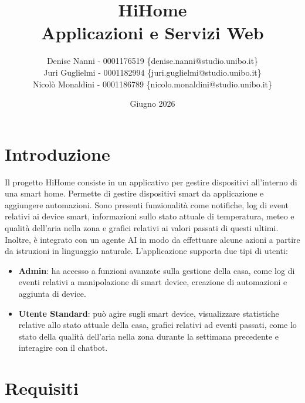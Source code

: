 \documentclass[a4paper,12pt]{article}
\title{
    HiHome \\
    \large Applicazioni e Servizi Web
}
\author{
    Denise Nanni - 0001176519 \{denise.nanni@studio.unibo.it\} \\
    Juri Guglielmi - 0001182994 \{juri.guglielmi@studio.unibo.it\} \\
    Nicolò Monaldini - 0001186789 \{nicolo.monaldini@studio.unibo.it\}
}
\date{Giugno 2026}
\begin{document}
\maketitle

\tableofcontents
\newpage

\section{Introduzione}
Il progetto HiHome consiste in un applicativo per gestire dispositivi all'interno di una smart home. Permette di gestire dispositivi smart da applicazione e aggiungere automazioni. Sono presenti funzionalità come notifiche, log di event relativi ai device smart, informazioni sullo stato attuale di temperatura, meteo e qualità dell'aria nella zona e grafici relativi ai valori passati di questi ultimi. Inoltre, è integrato con un agente AI in modo da effettuare alcune azioni a partire da istruzioni in linguaggio naturale. L'applicazione supporta due tipi di utenti:

\begin{itemize}
    \item \textbf{Admin}: ha accesso a funzioni avanzate sulla gestione della casa, come log di eventi relativi a manipolazione di smart device, creazione di automazioni e aggiunta di device.
    \item \textbf{Utente Standard}: può agire sugli smart device, visualizzare statistiche relative allo stato attuale della casa, grafici relativi ad eventi passati, come lo stato della qualità dell'aria nella zona durante la settimana precedente e interagire con il chatbot.
\end{itemize}

\newpage
\section{Requisiti}
\end{document}
